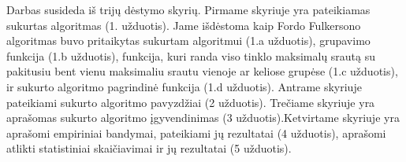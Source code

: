 Darbas susideda iš trijų dėstymo skyrių. Pirmame skyriuje yra pateikiamas sukurtas algoritmas (1. užduotis). Jame išdėstoma kaip Fordo Fulkersono algoritmas buvo pritaikytas sukurtam algoritmui (1.a užduotis), grupavimo funkcija (1.b užduotis), funkcija, kuri randa viso tinklo maksimalų srautą su pakitusiu bent vienu maksimaliu srautu vienoje ar keliose grupėse (1.c užduotis), ir sukurto algoritmo pagrindinė funkcija (1.d užduotis). Antrame skyriuje pateikiami sukurto algoritmo pavyzdžiai (2 užduotis). Trečiame skyriuje yra aprašomas sukurto algoritmo įgyvendinimas (3 užduotis).Ketvirtame skyriuje yra aprašomi empiriniai bandymai, pateikiami jų rezultatai (4 užduotis), aprašomi atlikti statistiniai skaičiavimai ir jų rezultatai (5 užduotis).